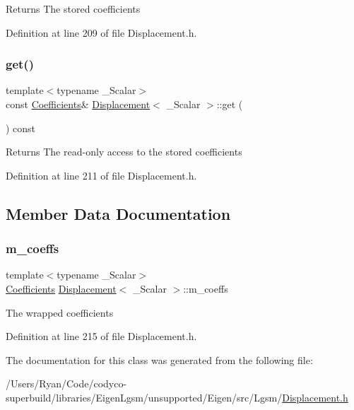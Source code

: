 \begin{DoxyReturn}{Returns}
The stored coefficients 
\end{DoxyReturn}


Definition at line 209 of file Displacement.\+h.

\hypertarget{class_displacement_adc206e570d379e6082e0cb2c7c82a41f}{}\label{class_displacement_adc206e570d379e6082e0cb2c7c82a41f} 
\subsubsection{\texorpdfstring{get()}{get()}\hspace{0.1cm}{\footnotesize\ttfamily [2/2]}}
{\footnotesize\ttfamily template$<$typename \+\_\+\+Scalar$>$ \\
const \hyperlink{class_displacement_a995adefd20afdb476cdef2aa7bbc4531}{Coefficients}\& \hyperlink{class_displacement}{Displacement}$<$ \+\_\+\+Scalar $>$\+::get (\begin{DoxyParamCaption}{ }\end{DoxyParamCaption}) const\hspace{0.3cm}{\ttfamily [inline]}}

\begin{DoxyReturn}{Returns}
The read-\/only access to the stored coefficients 
\end{DoxyReturn}


Definition at line 211 of file Displacement.\+h.



\subsection{Member Data Documentation}
\hypertarget{class_displacement_aa74b681eed8e46c0df5291f32e0d7445}{}\label{class_displacement_aa74b681eed8e46c0df5291f32e0d7445} 
\subsubsection{\texorpdfstring{m\+\_\+coeffs}{m\_coeffs}}
{\footnotesize\ttfamily template$<$typename \+\_\+\+Scalar$>$ \\
\hyperlink{class_displacement_a995adefd20afdb476cdef2aa7bbc4531}{Coefficients} \hyperlink{class_displacement}{Displacement}$<$ \+\_\+\+Scalar $>$\+::m\+\_\+coeffs\hspace{0.3cm}{\ttfamily [protected]}}

The wrapped coefficients 

Definition at line 215 of file Displacement.\+h.



The documentation for this class was generated from the following file\+:\begin{DoxyCompactItemize}
\item 
/\+Users/\+Ryan/\+Code/codyco-\/superbuild/libraries/\+Eigen\+Lgsm/unsupported/\+Eigen/src/\+Lgsm/\hyperlink{_displacement_8h}{Displacement.\+h}\end{DoxyCompactItemize}

